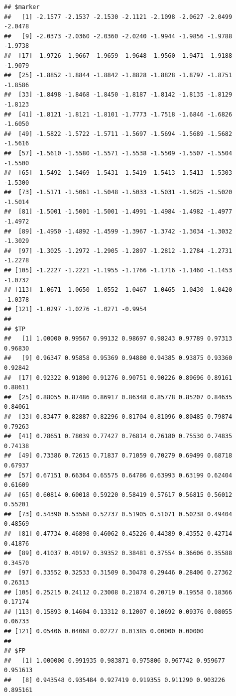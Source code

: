\documentclass{article}\usepackage[]{graphicx}\usepackage[]{color}
\makeatletter
\newenvironment{kframe}{%
 \def\at@end@of@kframe{}%
 \ifinner\ifhmode%
  \def\at@end@of@kframe{\end{minipage}}%
  \begin{minipage}{\columnwidth}%
 \fi\fi%
 \def\FrameCommand##1{\hskip\@totalleftmargin \hskip-\fboxsep
 \colorbox{shadecolor}{##1}\hskip-\fboxsep
     \hskip-\linewidth \hskip-\@totalleftmargin \hskip\columnwidth}%
 \MakeFramed {\advance\hsize-\width
   \@totalleftmargin\z@ \linewidth\hsize
   \@setminipage}}%
 {\par\unskip\endMakeFramed%
 \at@end@of@kframe}
\newenvironment{knitrout}{}{} %
\makeatother
\begin{document}
\begin{knitrout}
{}


\begin{kframe}\begin{verbatim}
## $marker
##   [1] -2.1577 -2.1537 -2.1530 -2.1121 -2.1098 -2.0627 -2.0499 -2.0478
##   [9] -2.0373 -2.0360 -2.0360 -2.0240 -1.9944 -1.9856 -1.9788 -1.9738
##  [17] -1.9726 -1.9667 -1.9659 -1.9648 -1.9560 -1.9471 -1.9188 -1.9079
##  [25] -1.8852 -1.8844 -1.8842 -1.8828 -1.8828 -1.8797 -1.8751 -1.8586
##  [33] -1.8498 -1.8468 -1.8450 -1.8187 -1.8142 -1.8135 -1.8129 -1.8123
##  [41] -1.8121 -1.8121 -1.8101 -1.7773 -1.7518 -1.6846 -1.6826 -1.6050
##  [49] -1.5822 -1.5722 -1.5711 -1.5697 -1.5694 -1.5689 -1.5682 -1.5616
##  [57] -1.5610 -1.5580 -1.5571 -1.5538 -1.5509 -1.5507 -1.5504 -1.5500
##  [65] -1.5492 -1.5469 -1.5431 -1.5419 -1.5413 -1.5413 -1.5303 -1.5300
##  [73] -1.5171 -1.5061 -1.5048 -1.5033 -1.5031 -1.5025 -1.5020 -1.5014
##  [81] -1.5001 -1.5001 -1.5001 -1.4991 -1.4984 -1.4982 -1.4977 -1.4972
##  [89] -1.4950 -1.4892 -1.4599 -1.3967 -1.3742 -1.3034 -1.3032 -1.3029
##  [97] -1.3025 -1.2972 -1.2905 -1.2897 -1.2812 -1.2784 -1.2731 -1.2278
## [105] -1.2227 -1.2221 -1.1955 -1.1766 -1.1716 -1.1460 -1.1453 -1.0732
## [113] -1.0671 -1.0650 -1.0552 -1.0467 -1.0465 -1.0430 -1.0420 -1.0378
## [121] -1.0297 -1.0276 -1.0271 -0.9954
## 
## $TP
##   [1] 1.00000 0.99567 0.99132 0.98697 0.98243 0.97789 0.97313 0.96830
##   [9] 0.96347 0.95858 0.95369 0.94880 0.94385 0.93875 0.93360 0.92842
##  [17] 0.92322 0.91800 0.91276 0.90751 0.90226 0.89696 0.89161 0.88611
##  [25] 0.88055 0.87486 0.86917 0.86348 0.85778 0.85207 0.84635 0.84061
##  [33] 0.83477 0.82887 0.82296 0.81704 0.81096 0.80485 0.79874 0.79263
##  [41] 0.78651 0.78039 0.77427 0.76814 0.76180 0.75530 0.74835 0.74138
##  [49] 0.73386 0.72615 0.71837 0.71059 0.70279 0.69499 0.68718 0.67937
##  [57] 0.67151 0.66364 0.65575 0.64786 0.63993 0.63199 0.62404 0.61609
##  [65] 0.60814 0.60018 0.59220 0.58419 0.57617 0.56815 0.56012 0.55201
##  [73] 0.54390 0.53568 0.52737 0.51905 0.51071 0.50238 0.49404 0.48569
##  [81] 0.47734 0.46898 0.46062 0.45226 0.44389 0.43552 0.42714 0.41876
##  [89] 0.41037 0.40197 0.39352 0.38481 0.37554 0.36606 0.35588 0.34570
##  [97] 0.33552 0.32533 0.31509 0.30478 0.29446 0.28406 0.27362 0.26313
## [105] 0.25215 0.24112 0.23008 0.21874 0.20719 0.19558 0.18366 0.17174
## [113] 0.15893 0.14604 0.13312 0.12007 0.10692 0.09376 0.08055 0.06733
## [121] 0.05406 0.04068 0.02727 0.01385 0.00000 0.00000
## 
## $FP
##   [1] 1.000000 0.991935 0.983871 0.975806 0.967742 0.959677 0.951613
##   [8] 0.943548 0.935484 0.927419 0.919355 0.911290 0.903226 0.895161

\end{verbatim}
\end{kframe}
\end{knitrout}
\end{document}
